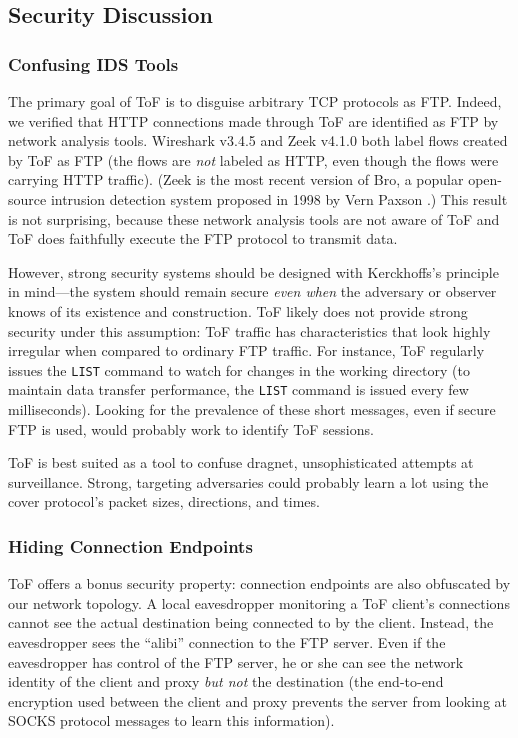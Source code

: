 \documentclass[letterpaper,twocolumn,11pt]{article}
\begin{document}
\subsection{Security Discussion} \label{subsec:security}

\subsubsection{Confusing IDS Tools}

The primary goal of ToF is to disguise arbitrary TCP protocols as FTP. Indeed,
we verified that HTTP connections made through ToF are identified as FTP by
network analysis tools. Wireshark v3.4.5 and Zeek v4.1.0 both label flows
created by ToF as FTP (the flows are \emph{not} labeled as HTTP, even though
the flows were carrying HTTP traffic).  (Zeek is the most recent version of
Bro, a popular open-source intrusion detection system proposed in 1998 by Vern
Paxson \cite{bro}.) This result is not surprising, because these network
analysis tools are not aware of ToF and ToF does faithfully execute the FTP
protocol to transmit data.

However, strong security systems should be designed with Kerckhoffs's principle
in mind---the system should remain secure \emph{even when} the adversary or
observer knows of its existence and construction. ToF likely does not provide
strong security under this assumption: ToF traffic has characteristics that
look highly irregular when compared to ordinary FTP traffic. For instance, ToF
regularly issues the \texttt{LIST} command to watch for changes in the working
directory (to maintain data transfer performance, the \texttt{LIST} command is
issued every few milliseconds). Looking for the prevalence of these short
messages, even if secure FTP is used, would probably work to identify ToF
sessions.

ToF is best suited as a tool to confuse dragnet, unsophisticated attempts at
surveillance. Strong, targeting adversaries could probably learn a lot using
the cover protocol's packet sizes, directions, and times.

\subsubsection{Hiding Connection Endpoints}

ToF offers a bonus security property: connection endpoints are also obfuscated
by our network topology. A local eavesdropper monitoring a ToF client's
connections cannot see the actual destination being connected to by the client.
Instead, the eavesdropper sees the ``alibi'' connection to the FTP server.
Even if the eavesdropper has control of the FTP server, he or she can see the
network identity of the client and proxy \emph{but not} the destination (the
end-to-end encryption used between the client and proxy prevents the server from
looking at SOCKS protocol messages to learn this information).
\end{document}

